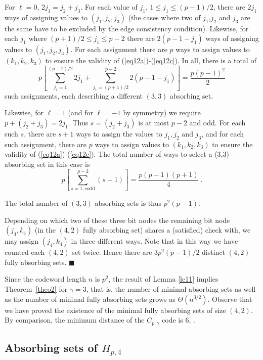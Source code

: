 For $\ell=0$, $2j_1=j_2+j_3$. For each value of $j_1$, $1 \leq j_1
\leq (p-1)/2$, there are $2j_1$ ways of assigning values to
$(j_1,j_2,j_3)$ (the cases where two of $j_1$,$j_2$ and $j_3$ are
the same have to be excluded by the edge consistency condition).
Likewise, for each $j_1$ where $(p+1)/2 \leq j_1 \leq p-2$ there
are $2(p-1-j_1)$ ways of assigning values to $(j_1,j_2,j_3)$. For
each assignment there are $p$ ways to assign values to
$(k_1,k_2,k_3)$ to ensure the validity of
(\ref{eq12a})-(\ref{eq12c}). In all, there is a total of
\[p\left[\sum_{j_1=1}^{(p-1)/2} 2j_1 + \sum_{j_1=(p+1)/2}^{p-2}
2(p-1-j_1)\right] = \frac{p(p-1)^2}{2}\] such assignments, each
describing a different $(3,3)$ absorbing set.

Likewise, for $\ell=1$ (and for $\ell=-1$ by symmetry) we require
$p+(j_2+j_3)=2j_1$. Thus $s=(j_2+j_3)$ is at most $p-2$ and odd.
For each such $s$, there are $s+1$ ways to assign the values to
$j_1,j_2$ and $j_3$, and for each such assignment, there are $p$
ways to assign values to $(k_1,k_2,k_3)$ to ensure the validity of
(\ref{eq12a})-(\ref{eq12c}). The total number of ways to select a
(3,3) absorbing set in this case is
\[
p\left[\sum_{s=1, s \text{
odd}}^{p-2}(s+1)\right]=\frac{p(p-1)(p+1)}{4}~.
\]

The total number of $(3,3)$ absorbing sets is thus $p^2(p-1)$.

Depending on which two of these three bit nodes the remaining bit
node $(j_4,k_4)$ (in the $(4,2)$ fully absorbing set) shares a
(satisfied) check with, we may assign $(j_4,k_4)$ in three
different ways. Note that in this way we have counted each $(4,2)$
set twice. Hence there are $3p^2(p-1)/2$ distinct $(4,2)$ fully
absorbing sets. \hfill$\blacksquare$


Since the codeword length $n$ is $p^2$, the result of Lemma
\ref{le11} implies Theorem~\ref{theo2} for $\gamma=3$, that is, the
number of minimal absorbing sets as well as the number of minimal
fully absorbing sets grows as $\Theta(n^{3/2})$. Observe that we
have proved  the existence of the minimal fully absorbing sets of
size $(4,2)$. By comparison, the minimum distance of the
$C_{p,\gamma}$ code is $6$, \cite{helles}.

\subsection{Absorbing sets of $H_{p,4}$}\label{theo14}



